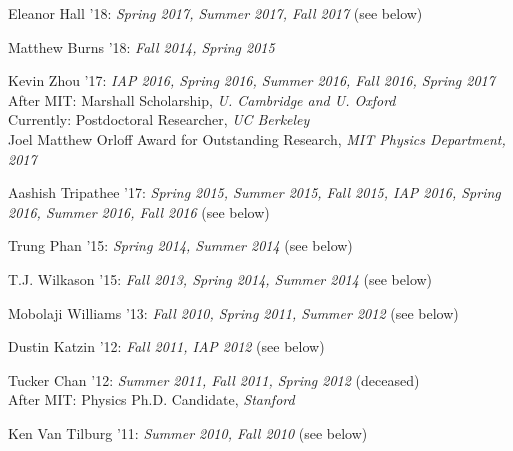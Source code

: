 \item Eleanor Hall '18: \emph{Spring 2017, Summer 2017, Fall 2017} (see below) 

\item Matthew Burns '18: \emph{Fall 2014, Spring 2015}

\item Kevin Zhou '17: \emph{IAP 2016, Spring 2016, Summer 2016, Fall 2016, Spring 2017}
\\ After MIT: Marshall Scholarship, \emph{U. Cambridge and U. Oxford}
\\ Currently: Postdoctoral Researcher, \emph{UC Berkeley}
\\ Joel Matthew Orloff Award for Outstanding Research, \emph{MIT Physics Department, 2017}

\item Aashish Tripathee '17: \emph{Spring 2015, Summer 2015, Fall 2015, IAP 2016, Spring 2016, Summer 2016, Fall 2016} (see below) 

\item Trung Phan '15: \emph{Spring 2014, Summer 2014} (see below) 

\item T.J. Wilkason '15: \emph{Fall 2013, Spring 2014, Summer 2014} (see below) 

\item Mobolaji Williams '13: \emph{Fall 2010, Spring 2011, Summer 2012} (see below) 

\item Dustin Katzin '12: \emph{Fall 2011, IAP 2012} (see below) 

\item Tucker Chan '12: \emph{Summer 2011, Fall 2011, Spring 2012} (deceased) 
\\ After MIT: Physics Ph.D. Candidate, \emph{Stanford}

\item Ken Van Tilburg '11: \emph{Summer 2010, Fall 2010} (see below) 

\el
